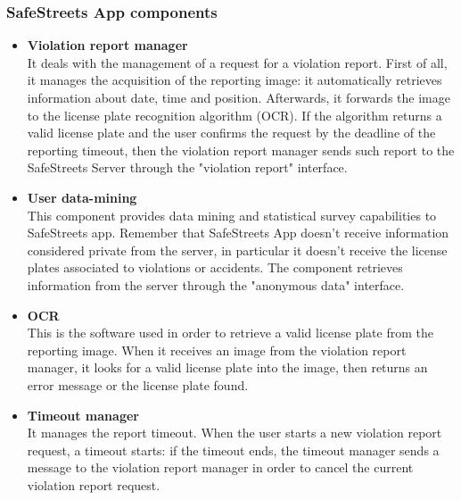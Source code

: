 \documentclass{article}
\begin{document}
		\subsubsection{SafeStreets App components}
		\begin{itemize}
			\item \textbf{Violation report manager}\\
			It deals with the management of a request for a violation report. First of all, it manages the acquisition of the reporting image: it automatically retrieves information about date, time and position. Afterwards, it forwards the image to the license plate recognition algorithm (OCR). If the algorithm returns a valid license plate and the user confirms the request by the deadline of the reporting timeout, then the violation report manager sends such report to the SafeStreets Server through the "violation report" interface.
			\item \textbf{User data-mining}\\
			This component provides data mining and statistical survey capabilities to SafeStreets app. Remember that SafeStreets App doesn't receive information considered private from the server, in particular it doesn't receive the license plates associated to violations or accidents. The component retrieves information from the server through the "anonymous data" interface.
			\item \textbf{OCR}\\
			This is the software used in order to retrieve a valid license plate from the reporting image. When it receives an image from the violation report manager, it looks for a valid license plate into the image, then returns an error message or the license plate found.
			\item \textbf{Timeout manager}\\
			It manages the report timeout. When the user starts a new violation report request, a timeout starts: if the timeout ends, the timeout manager sends a message to the violation report manager in order to cancel the current violation report request.
		\end{itemize}
\end{document}
